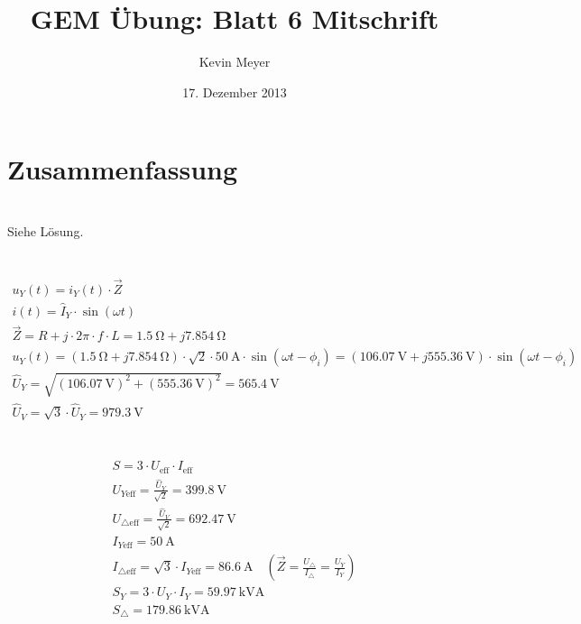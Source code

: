 \documentclass[10pt,a4paper]{article}
\let\newvec = \vec
\let\vec = \oldvec
\begin{document}
\title{GEM Übung: \textbf{Blatt 6} Mitschrift}
\date{17. Dezember 2013}
\author{Kevin Meyer}
\maketitle

\section*{Zusammenfassung}

\section{}
Siehe Lösung.

\section{}
\begin{align*}
u_Y(t) = i_Y(t) \cdot \newvec{Z}\\
i(t) = \hat{I}_{Y} \cdot \sin (\omega t)\\
\newvec Z = R + j \cdot 2\pi \cdot f \cdot L = \SI{1.5}{\ohm} + j \SI{7.854}{\ohm}\\
u_Y(t) = (\SI{1.5}{\ohm} + j \SI{7.854}{\ohm}) \cdot \sqrt{2} \cdot \SI{50}{\ampere} \cdot \sin(\omega t - \phi_i) = (\SI{106.07}{\volt} + j \SI{555.36}{\volt}) \cdot \sin(\omega t - \phi_i)\\
\hat{U}_Y = \sqrt{(\SI{106.07}{\volt})^2 + (\SI{555.36}{\volt})^2} = \SI{565.4}{\volt}\\
\hat{U}_V = \sqrt{3} \cdot \hat{U}_Y = \SI{979.3}{\volt}
\end{align*}

\section{}
\begin{align*}
S = 3 \cdot U_\text{eff} \cdot I_\text{eff}\\
U_{Y\text{eff}} = \frac{\hat{U}_Y}{\sqrt{2}} = \SI{399.8}{\volt}\\
U_{\triangle\text{eff}} = \frac{\hat{U}_V}{\sqrt{2}} = \SI{692.47}{\volt}\\
I_{Y\text{eff}} = \SI{50}{\ampere}\\
I_{\triangle\text{eff}} = \sqrt{3} \cdot I_{Y\text{eff}} = \SI{86.6}{\ampere} \quad \left( \newvec{Z} = \frac{U_\triangle}{I_\triangle} = \frac{U_Y}{I_Y}\right)\\
S_Y = 3 \cdot U_Y \cdot I_Y = \SI{59.97}{\kilo\volt\ampere}\\
S_\triangle = \SI{179.86}{\kilo\volt\ampere}
\end{align*}
\end{document}
